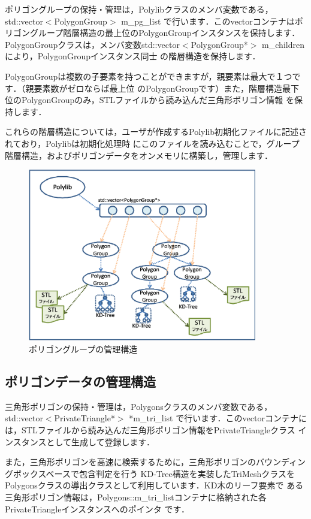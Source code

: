 {ポリゴングループの保持・管理は，Polylibクラスのメンバ変数である，std::vector$<$PolygonGroup$>$ m\_pg\_list
で行います．このvectorコンテナはポリゴングループ階層構造の最上位のPolygonGroupインスタンスを保持します．
PolygonGroupクラスは，メンバ変数std::vector$<$PolygonGroup*$>$ m\_childrenにより，PolygonGroupインスタンス同士
の階層構造を保持します．

PolygonGroupは複数の子要素を持つことができますが，親要素は最大で１つです．（親要素数がゼロならば最上位
のPolygonGroupです）また，階層構造最下位のPolygonGroupのみ，STLファイルから読み込んだ三角形ポリゴン情報
を保持します．

これらの階層構造については，ユーザが作成するPolylib初期化ファイルに記述されており，Polylibは初期化処理時
にこのファイルを読み込むことで，グループ階層構造，およびポリゴンデータをオンメモリに構築し，管理します．

\begin{figure}[H]
 \centering
 \includegraphics[width=10cm]{clip001.eps}
 \caption{ポリゴングループの管理構造}
\end{figure}

%
\subsection{ポリゴンデータの管理構造}

三角形ポリゴンの保持・管理は，Polygonsクラスのメンバ変数である，std::vector$<$PrivateTriangle*$>$ *m\_tri\_list
 で行います．このvectorコンテナには，STLファイルから読み込んだ三角形ポリゴン情報をPrivateTriangleクラス
インスタンスとして生成して登録します．

また，三角形ポリゴンを高速に検索するために，三角形ポリゴンのバウンディングボックスベースで包含判定を行う
KD-Tree構造を実装したTriMeshクラスをPolygonsクラスの導出クラスとして利用しています．KD木のリーフ要素で
ある三角形ポリゴン情報は，Polygons::m\_tri\_listコンテナに格納された各PrivateTriangleインスタンスへのポインタ
です．

}

